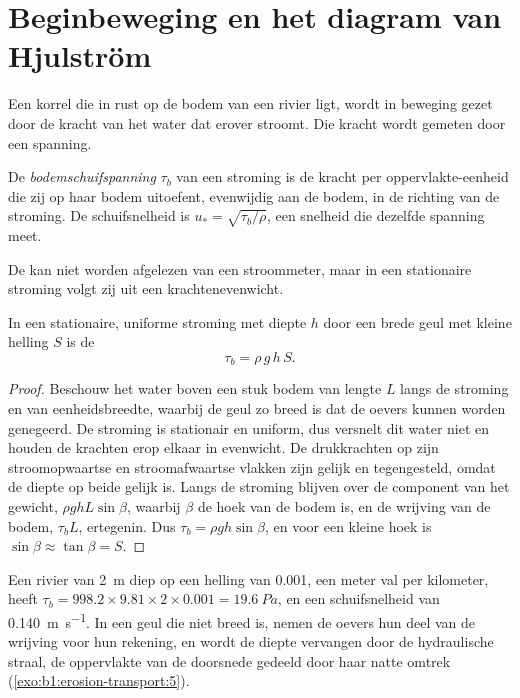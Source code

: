 \section{Beginbeweging en het diagram van Hjulström}\label{sec:b1:erosion-transport:threshold}

Een korrel die in rust op de bodem van een rivier ligt, wordt in beweging gezet door de kracht van het water dat erover stroomt. Die kracht wordt gemeten door een spanning.

\begin{definition}\label{def:b1:erosion-transport:bed-shear}
De \emph{bodemschuifspanning} $\tau_b$ van een stroming is de kracht per oppervlakte-eenheid die zij op haar bodem uitoefent, evenwijdig aan de bodem, in de richting van de stroming. De schuifsnelheid is $u_* = \sqrt{\tau_b/\rho}$, een snelheid die dezelfde spanning meet.
\end{definition}

De  kan niet worden afgelezen van een stroommeter, maar in een stationaire stroming volgt zij uit een krachtenevenwicht.

\begin{proposition}\label{prop:b1:erosion-transport:depth-slope}
In een stationaire, uniforme stroming met diepte $h$ door een brede geul met kleine helling $S$ is de 
\[
  \tau_b = \rho\,g\,h\,S .
\]
\end{proposition}

\begin{proof}
Beschouw het water boven een stuk bodem van lengte $L$ langs de stroming en van eenheidsbreedte, waarbij de geul zo breed is dat de oevers kunnen worden genegeerd. De stroming is stationair en uniform, dus versnelt dit water niet en houden de krachten erop elkaar in evenwicht. De drukkrachten op zijn stroomopwaartse en stroomafwaartse vlakken zijn gelijk en tegengesteld, omdat de diepte op beide gelijk is. Langs de stroming blijven over de component van het gewicht, $\rho g h L \sin\beta$, waarbij $\beta$ de hoek van de bodem is, en de wrijving van de bodem, $\tau_b L$, ertegenin. Dus $\tau_b
= \rho g h \sin\beta$, en voor een kleine hoek is $\sin\beta \approx \tan\beta = S$.
\end{proof}

Een rivier van \qty{2}{m} diep op een helling van \num{0.001}, een meter val per kilometer, heeft $\tau_b = 998.2 \times 9.81 \times 2 \times 0.001 =
\qty{19.6}{Pa}$, en een schuifsnelheid van \qty{0.140}{m.s^{-1}}. In een geul die niet breed is, nemen de oevers hun deel van de wrijving voor hun rekening, en wordt de diepte vervangen door de hydraulische straal, de oppervlakte van de doorsnede gedeeld door haar natte omtrek (\cref{exo:b1:erosion-transport:5}).

